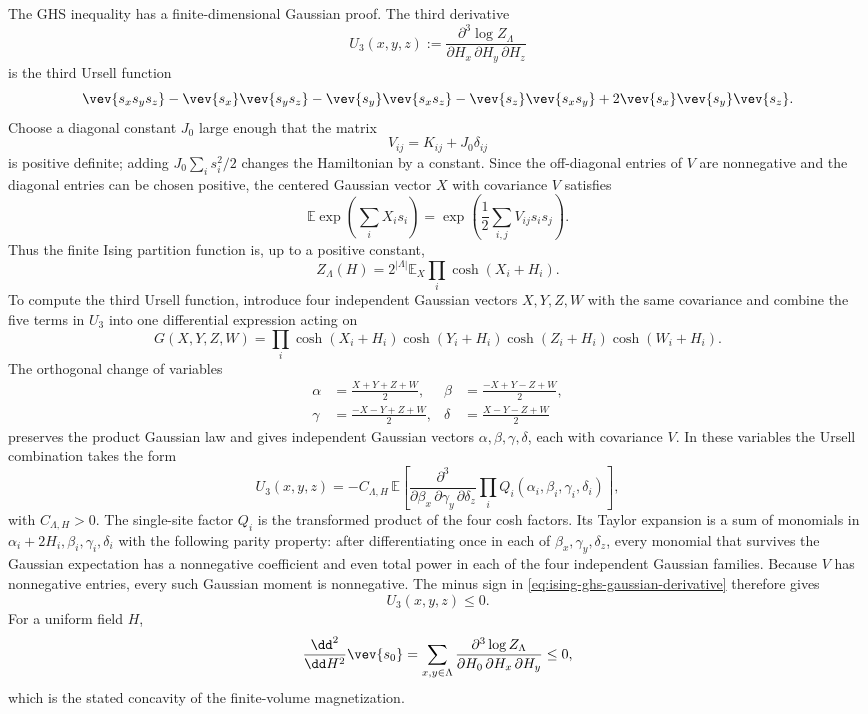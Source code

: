 The GHS inequality has a finite-dimensional Gaussian proof.  The third
derivative
\[
  U_3(x,y,z)
  :=
  \frac{\partial^3\log Z_\Lambda}
    {\partial H_x\,\partial H_y\,\partial H_z}
\]
is the third Ursell function
\[
  \vev{s_xs_ys_z}
  -\vev{s_x}\vev{s_ys_z}
  -\vev{s_y}\vev{s_xs_z}
  -\vev{s_z}\vev{s_xs_y}
  +2\vev{s_x}\vev{s_y}\vev{s_z}.
\]
Choose a diagonal constant \(J_0\) large enough that the matrix
\[
  V_{ij}
  =
  K_{ij}+J_0\delta_{ij}
\]
is positive definite; adding \(J_0\sum_i s_i^2/2\) changes the Hamiltonian by
a constant.  Since the off-diagonal entries of \(V\) are nonnegative and the
diagonal entries can be chosen positive, the centered Gaussian vector \(X\)
with covariance \(V\) satisfies
\[
  \mathbb E\exp\!\left(\sum_i X_i s_i\right)
  =
  \exp\!\left(\frac12\sum_{i,j}V_{ij}s_is_j\right).
\]
Thus the finite Ising partition function is, up to a positive constant,
\begin{equation}
  Z_\Lambda(H)
  =
  2^{|\Lambda|}
  \mathbb E_X\prod_i \cosh(X_i+H_i).
  \label{eq:ising-ghs-gaussian-partition}
\end{equation}
To compute the third Ursell function, introduce four independent Gaussian
vectors \(X,Y,Z,W\) with the same covariance and combine the five terms in
\(U_3\) into one differential expression acting on
\[
  G(X,Y,Z,W)
  =
  \prod_i
  \cosh(X_i+H_i)\cosh(Y_i+H_i)
  \cosh(Z_i+H_i)\cosh(W_i+H_i).
\]
The orthogonal change of variables
\[
  \begin{aligned}
  \alpha&=\frac{X+Y+Z+W}{2},
  &
  \beta&=\frac{-X+Y-Z+W}{2},\\
  \gamma&=\frac{-X-Y+Z+W}{2},
  &
  \delta&=\frac{X-Y-Z+W}{2}
  \end{aligned}
\]
preserves the product Gaussian law and gives independent Gaussian vectors
\(\alpha,\beta,\gamma,\delta\), each with covariance \(V\).  In these
variables the Ursell combination takes the form
\begin{equation}
  U_3(x,y,z)
  =
  -C_{\Lambda,H}\,
  \mathbb E\!\left[
    \frac{\partial^3}{\partial\beta_x\,\partial\gamma_y\,\partial\delta_z}
    \prod_i Q_i(\alpha_i,\beta_i,\gamma_i,\delta_i)
  \right],
  \label{eq:ising-ghs-gaussian-derivative}
\end{equation}
with \(C_{\Lambda,H}>0\).  The single-site factor \(Q_i\) is the transformed
product of the four cosh factors.  Its Taylor expansion is a sum of monomials
in \(\alpha_i+2H_i,\beta_i,\gamma_i,\delta_i\) with the following parity
property: after differentiating once in each of
\(\beta_x,\gamma_y,\delta_z\), every monomial that survives the Gaussian
expectation has a nonnegative coefficient and even total power in each of the
four independent Gaussian families.  Because \(V\) has nonnegative entries,
every such Gaussian moment is nonnegative.  The minus sign in
\eqref{eq:ising-ghs-gaussian-derivative} therefore gives
\[
  U_3(x,y,z)\leq0 .
\]
For a uniform field \(H\),
\[
  \frac{\dd^2}{\dd H^2}\vev{s_0}
  =
  \sum_{x,y\in\Lambda}
  \frac{\partial^3\log Z_\Lambda}{\partial H_0\,\partial H_x\,\partial H_y}
  \leq0 ,
\]
which is the stated concavity of the finite-volume magnetization.

